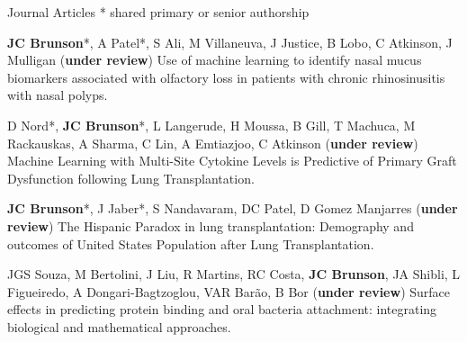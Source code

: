 \documentclass[10pt,a4paper]{article}
\begin{document}

\vspace{.25cm}
{\sc Journal Articles}\newline
* shared primary or senior authorship
\begin{enumerate}[label={[\arabic*]},labelindent=1cm,nolistsep]
\item
{\bfseries JC Brunson}*, A Patel*, S Ali, M Villaneuva, J Justice, B Lobo, C Atkinson, J Mulligan ({\bfseries under review}) Use of machine learning to identify nasal mucus biomarkers associated with olfactory loss in patients with chronic rhinosinusitis with nasal polyps.
\item
D Nord*, {\bfseries JC Brunson}*, L Langerude, H Moussa, B Gill, T Machuca, M Rackauskas, A Sharma, C Lin, A Emtiazjoo, C Atkinson ({\bfseries under review}) Machine Learning with Multi-Site Cytokine Levels is Predictive of Primary Graft Dysfunction following Lung Transplantation.
\item
{\bfseries JC Brunson}*, J Jaber*, S Nandavaram, DC Patel, D Gomez Manjarres ({\bfseries under review}) The Hispanic Paradox in lung transplantation: Demography and outcomes of United States Population after Lung Transplantation.
\item
JGS Souza, M Bertolini, J Liu, R Martins, RC Costa, {\bfseries JC Brunson}, JA Shibli, L Figueiredo, A Dongari-Bagtzoglou, VAR Bar\~{a}o, B Bor ({\bfseries under review}) Surface effects in predicting protein binding and oral bacteria attachment: integrating biological and mathematical approaches.

\end{enumerate}
\end{document}
